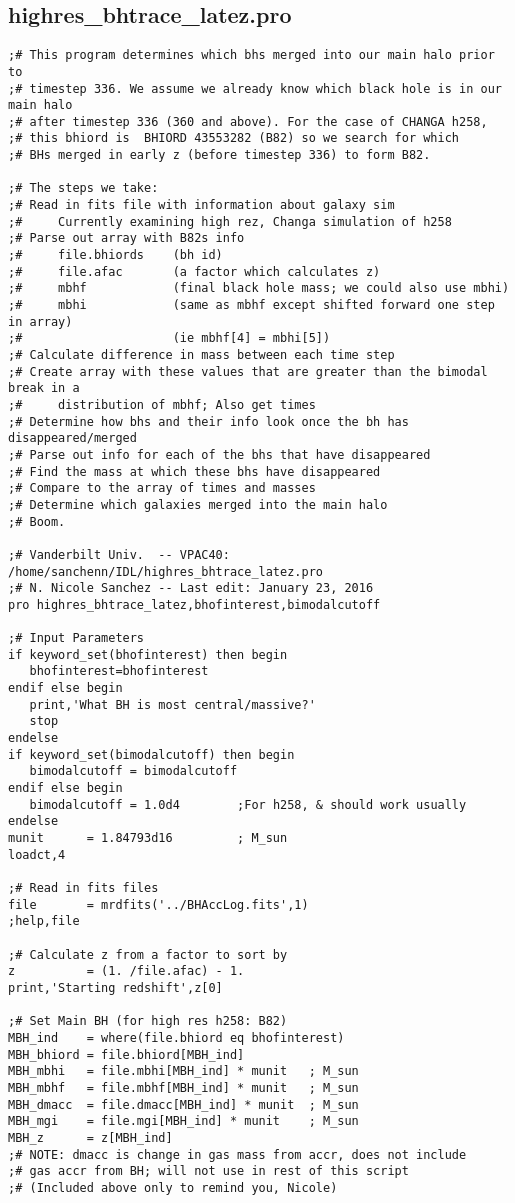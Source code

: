 \documentclass[12pt,headA,chapB]{fiskthesis}
\begin{document}
\subsection{highres\_bhtrace\_latez.pro}
\begin{verbatim}
;# This program determines which bhs merged into our main halo prior to
;# timestep 336. We assume we already know which black hole is in our main halo
;# after timestep 336 (360 and above). For the case of CHANGA h258,
;# this bhiord is  BHIORD 43553282 (B82) so we search for which 
;# BHs merged in early z (before timestep 336) to form B82.

;# The steps we take:
;# Read in fits file with information about galaxy sim
;#     Currently examining high rez, Changa simulation of h258
;# Parse out array with B82s info
;#     file.bhiords    (bh id)
;#     file.afac       (a factor which calculates z)
;#     mbhf            (final black hole mass; we could also use mbhi)
;#     mbhi            (same as mbhf except shifted forward one step in array)
;#                     (ie mbhf[4] = mbhi[5])
;# Calculate difference in mass between each time step
;# Create array with these values that are greater than the bimodal break in a
;#     distribution of mbhf; Also get times
;# Determine how bhs and their info look once the bh has disappeared/merged
;# Parse out info for each of the bhs that have disappeared
;# Find the mass at which these bhs have disappeared
;# Compare to the array of times and masses
;# Determine which galaxies merged into the main halo
;# Boom.

;# Vanderbilt Univ.  -- VPAC40: /home/sanchenn/IDL/highres_bhtrace_latez.pro
;# N. Nicole Sanchez -- Last edit: January 23, 2016
pro highres_bhtrace_latez,bhofinterest,bimodalcutoff

;# Input Parameters
if keyword_set(bhofinterest) then begin
   bhofinterest=bhofinterest  
endif else begin
   print,'What BH is most central/massive?' 
   stop
endelse
if keyword_set(bimodalcutoff) then begin
   bimodalcutoff = bimodalcutoff 
endif else begin
   bimodalcutoff = 1.0d4        ;For h258, & should work usually
endelse
munit      = 1.84793d16         ; M_sun
loadct,4

;# Read in fits files
file       = mrdfits('../BHAccLog.fits',1)
;help,file

;# Calculate z from a factor to sort by
z          = (1. /file.afac) - 1.
print,'Starting redshift',z[0]

;# Set Main BH (for high res h258: B82)
MBH_ind    = where(file.bhiord eq bhofinterest) 
MBH_bhiord = file.bhiord[MBH_ind]
MBH_mbhi   = file.mbhi[MBH_ind] * munit   ; M_sun
MBH_mbhf   = file.mbhf[MBH_ind] * munit   ; M_sun
MBH_dmacc  = file.dmacc[MBH_ind] * munit  ; M_sun
MBH_mgi    = file.mgi[MBH_ind] * munit    ; M_sun
MBH_z      = z[MBH_ind]
;# NOTE: dmacc is change in gas mass from accr, does not include 
;# gas accr from BH; will not use in rest of this script
;# (Included above only to remind you, Nicole)


\end{verbatim}
\end{document}
